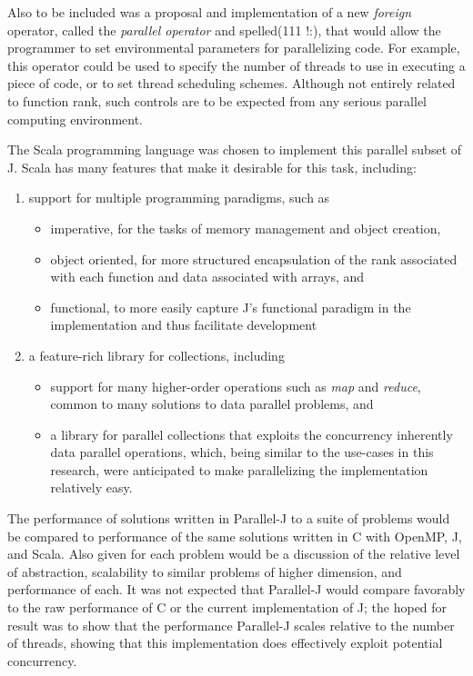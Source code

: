 Also to be included was a proposal and implementation of a new \textit{foreign} operator, called the \textit{parallel operator} and spelled\ttfamily (111 !:)\normalfont , 
that would allow the programmer to set environmental parameters for parallelizing code.
For example, this operator could be used to specify the number of threads to use in executing a piece of code, 
or to set thread scheduling schemes.
Although not entirely related to function rank, such controls are to be expected from any serious parallel computing environment.

The Scala programming language\cite{scala} 
was chosen to implement this parallel subset of J.
Scala has many features that make it desirable for this task, including: 
\begin{enumerate} 
	\item support for multiple programming paradigms, such as
	\begin{itemize}
		\item imperative, for the tasks of memory management and object creation,
		\item object oriented, for more structured encapsulation of the rank associated with each function 
			and data associated with arrays, and
		\item functional, to more easily capture J's functional paradigm in the implementation and thus facilitate development
	\end{itemize}
	\item a feature-rich library for collections, including 
	\begin{itemize}
		\item support for many higher-order operations such as \textit{map} and \textit{reduce}, \cite{scala28col}
			common to many solutions to data parallel problems, and
		\item a library for parallel collections that exploits the concurrency inherently data parallel operations,\cite{pc}
			which, being similar to the use-cases in this research, were anticipated to make parallelizing the implementation relatively easy.
	\end{itemize}
\end{enumerate}

The performance of solutions written in Parallel-J to a suite of problems would be compared to
performance of the same solutions written in C with OpenMP, J, and Scala.
Also given for each problem would be 
a discussion of the relative level of abstraction, scalability to similar problems of higher dimension, and performance of each. 
It was not expected that Parallel-J would compare favorably to the raw performance of C or the current implementation of J; 
the hoped for result was to show that the performance Parallel-J scales relative to the number of threads, 
showing that this implementation does effectively exploit potential concurrency.

